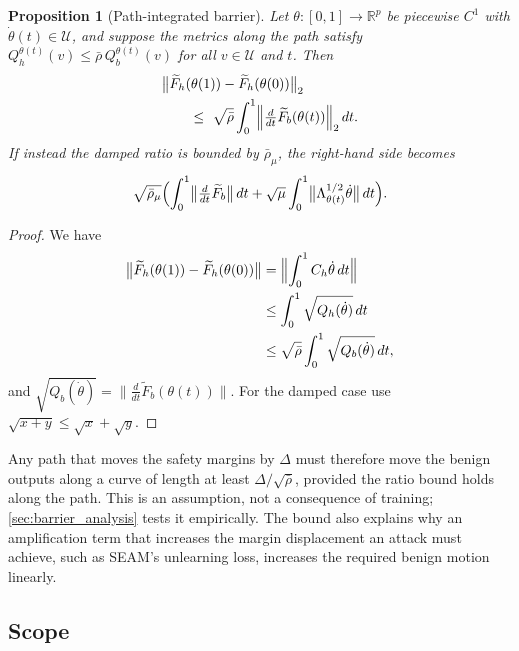 \documentclass[11pt]{article}
\newtheorem{proposition}{Proposition}
\newcommand{\R}{\mathbb{R}}
\newcommand{\U}{\mathcal{U}}
\newcommand{\Ft}{\widetilde{F}}
\newcommand{\Ch}{C_{h}}
\begin{document}
\begin{proposition}[Path-integrated barrier]
\label{prop:path}
Let $\theta:[0,1]\to\R^p$ be piecewise $C^1$ with $\dot\theta(t)\in\U$, and suppose the metrics along the path satisfy $Q_h^{\theta(t)}(v)\le\bar\rho\,Q_b^{\theta(t)}(v)$ for all $v\in\U$ and $t$. Then
\begin{equation*}
\begin{aligned}
&\bigl\|\Ft_h(\theta(1))-\Ft_h(\theta(0))\bigr\|_2\\
&\qquad\le\ \sqrt{\bar\rho}\int_0^1\Bigl\|\tfrac{d}{dt}\Ft_b(\theta(t))\Bigr\|_2\,dt .
\end{aligned}
\end{equation*}
If instead the damped ratio is bounded by $\bar\rho_\mu$, the right-hand side becomes
\begin{equation*}
\sqrt{\bar\rho_\mu}\Bigl(\int_0^1\bigl\|\tfrac{d}{dt}\Ft_b\bigr\|\,dt+\sqrt\mu\int_0^1\bigl\|\Lambda_{\theta(t)}^{1/2}\dot\theta\bigr\|\,dt\Bigr).
\end{equation*}
\end{proposition}
\begin{proof}
We have
\begin{equation*}
\begin{aligned}
\bigl\|\Ft_h(\theta(1))-\Ft_h(\theta(0))\bigr\|&=\Bigl\|\int_0^1\Ch\dot\theta\,dt\Bigr\|\\
&\le\int_0^1\sqrt{Q_h(\dot\theta)}\,dt\\
&\le\sqrt{\bar\rho}\int_0^1\sqrt{Q_b(\dot\theta)}\,dt,
\end{aligned}
\end{equation*}
and $\sqrt{Q_b(\dot\theta)}=\|\tfrac{d}{dt}\Ft_b(\theta(t))\|$. For the damped case use $\sqrt{x+y}\le\sqrt x+\sqrt y$.
\end{proof}
Any path that moves the safety margins by $\Delta$ must therefore move the benign outputs along a curve of length at least $\Delta/\sqrt{\bar\rho}$, provided the ratio bound holds along the path. This is an assumption, not a consequence of training; \cref{sec:barrier_analysis} tests it empirically. The bound also explains why an amplification term that increases the margin displacement an attack must achieve, such as SEAM's unlearning loss, increases the required benign motion linearly.

\subsection{Scope}
\label{app:scope}
\end{document}
